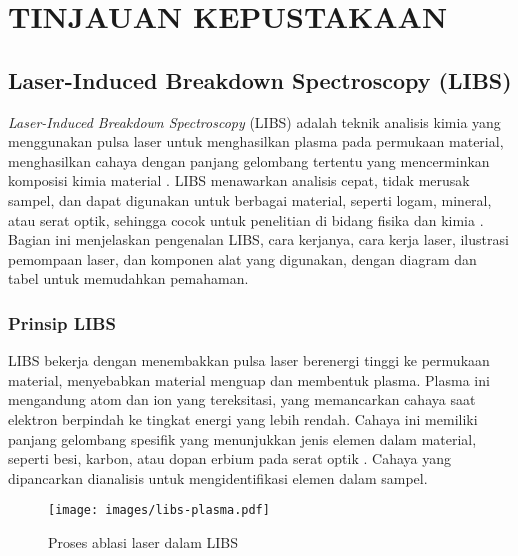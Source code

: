 
\chapter{TINJAUAN KEPUSTAKAAN}

\section{Laser-Induced Breakdown Spectroscopy (LIBS)}
\label{sec:libs_intro}

\textit{Laser-Induced Breakdown Spectroscopy} (LIBS) adalah teknik analisis kimia yang menggunakan pulsa laser untuk menghasilkan plasma pada permukaan material, menghasilkan cahaya dengan panjang gelombang tertentu yang mencerminkan komposisi kimia material \citep{Cremers2013}. LIBS menawarkan analisis cepat, tidak merusak sampel, dan dapat digunakan untuk berbagai material, seperti logam, mineral, atau serat optik, sehingga cocok untuk penelitian di bidang fisika dan kimia \citep{Miziolek2006}. Bagian ini menjelaskan pengenalan LIBS, cara kerjanya, cara kerja laser, ilustrasi pemompaan laser, dan komponen alat yang digunakan, dengan diagram dan tabel untuk memudahkan pemahaman.

\subsection{Prinsip LIBS}
\label{subsec:libs_principles}

LIBS bekerja dengan menembakkan pulsa laser berenergi tinggi ke permukaan material, menyebabkan material menguap dan membentuk plasma. Plasma ini mengandung atom dan ion yang tereksitasi, yang memancarkan cahaya saat elektron berpindah ke tingkat energi yang lebih rendah. Cahaya ini memiliki panjang gelombang spesifik yang menunjukkan jenis elemen dalam material, seperti besi, karbon, atau dopan erbium pada serat optik \citep{Singh2007}. Cahaya yang dipancarkan dianalisis untuk mengidentifikasi elemen dalam sampel.
\begin{figure}[h]
    \centering
    \texttt{[image: images/libs-plasma.pdf]}
    \caption{Proses ablasi laser dalam LIBS \citep{harmon-2021}}
    \label{fig:laser_ablation}
\end{figure}


